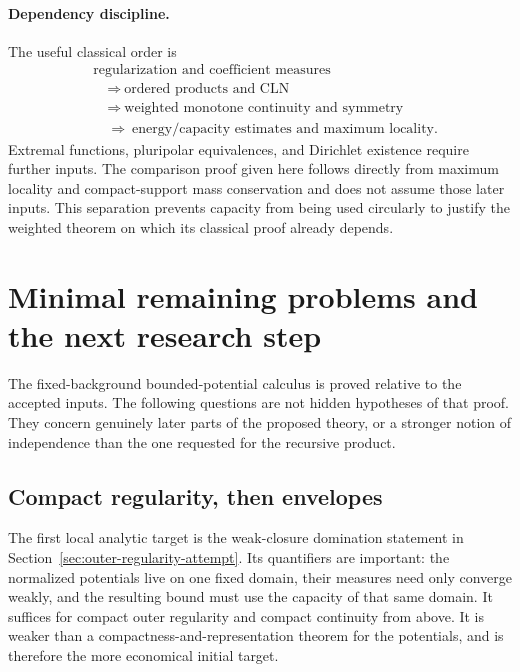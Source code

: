 \documentclass[11pt,a4paper]{article}
\numberwithin{equation}{section}
\theoremstyle{definition}
\theoremstyle{remark}
\begin{document}
\paragraph{Dependency discipline.}
The useful classical order is
\[
 \begin{aligned}
 &\text{regularization and coefficient measures}\\
 &\quad\Longrightarrow\ \text{ordered products and CLN}\\
 &\quad\Longrightarrow\ \text{weighted monotone continuity and symmetry}\\
 &\quad\Longrightarrow\ \text{energy/capacity estimates and maximum locality}.
 \end{aligned}
\]
Extremal functions, pluripolar equivalences, and Dirichlet existence
require further inputs. The comparison proof given here follows directly
from maximum locality and compact-support mass conservation and does
not assume those later inputs. This separation prevents capacity from
being used circularly to justify the weighted theorem on which its
classical proof already depends.



\section{Minimal remaining problems and the next research step}
\label{sec:frontiers}

The fixed-background bounded-potential calculus is proved relative to
the accepted inputs. The following questions are not hidden hypotheses
of that proof. They concern genuinely later parts of the proposed
theory, or a stronger notion of independence than the one requested
for the recursive product.

\subsection{Compact regularity, then envelopes}

The first local analytic target is the weak-closure domination statement
in Section~\ref{sec:outer-regularity-attempt}. Its quantifiers are
important: the normalized potentials live on one fixed domain,
their measures need only converge weakly, and the resulting bound must
use the capacity of that same domain. It suffices for compact outer
regularity and compact continuity from above. It is weaker than a
compactness-and-representation theorem for the potentials, and is
therefore the more economical initial target.
\end{document}
